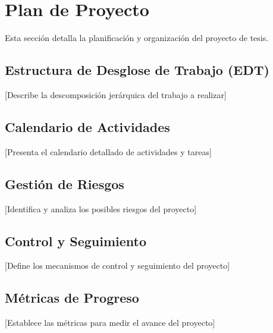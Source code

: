 \section{Plan de Proyecto}

Esta sección detalla la planificación y organización del proyecto de tesis.

\subsection{Estructura de Desglose de Trabajo (EDT)}
[Describe la descomposición jerárquica del trabajo a realizar]

\subsection{Calendario de Actividades}
[Presenta el calendario detallado de actividades y tareas]

\subsection{Gestión de Riesgos}
[Identifica y analiza los posibles riesgos del proyecto]

\subsection{Control y Seguimiento}
[Define los mecanismos de control y seguimiento del proyecto]

\subsection{Métricas de Progreso}
[Establece las métricas para medir el avance del proyecto]